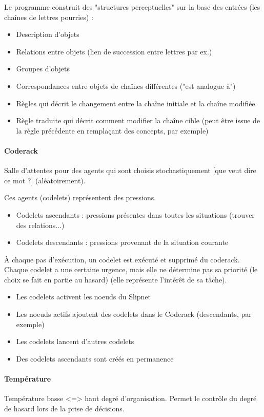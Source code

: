 \documentclass{article}           %
\begin{document}
Le programme construit des "structures perceptuelles" sur la base des entrées (les chaînes de lettres pourries) : 
\begin{itemize}
 \item Description d'objets
 \item Relations entre objets (lien de succession entre lettres par ex.)
 \item Groupes d'objets
 \item Correspondances entre objets de chaînes différentes ("est analogue à")
 \item Règles qui décrit le changement entre la chaîne initiale et la chaîne modifiée
 \item Règle traduite qui décrit comment modifier la chaîne cible (peut être issue de la règle précédente en remplaçant des concepts, par exemple)
\end{itemize}


\paragraph{Coderack}
Salle d'attentes pour des agents qui sont choisis stochastiquement [que veut dire ce mot ?] (aléatoirement).

Ces agents (codelets) représentent des pressions.
\begin{itemize}
 \item Codelets ascendants : pressions présentes dans toutes les situations (trouver des relations...)
 \item Codelets descendants : pressions provenant de la situation courante
\end{itemize}

À chaque pas d'exécution, un codelet est exécuté et supprimé du coderack. Chaque codelet a une certaine urgence, mais elle ne détermine pas sa priorité (le choix se fait en partie au hasard) (elle représente l'intérêt de sa tâche).

\begin{itemize}
 \item Les codelets activent les noeuds du Slipnet
 \item Les noeuds actifs ajoutent des codelets dans le Coderack (descendants, par exemple)
 \item Les codelets lancent d'autres codelets
 \item Des codelets ascendants sont créés en permanence
\end{itemize}

\paragraph{Température}
Température basse <=> haut degré d'organisation. Permet le contrôle du degré de hasard lors de la prise de décisions.
\end{document}
